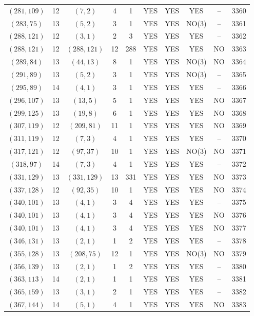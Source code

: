 \begin{longtable}{|c|c|c|c|c|c|c|c|c|c|}
$(281, 109)$ & 12 & $(7, 2)$ & 4 & 1 & YES & YES & YES & -- & 3360\\
$(283, 75)$ & 13 & $(5, 2)$ & 3 & 1 & YES & YES & NO(3) & -- & 3361\\
$(288, 121)$ & 12 & $(3, 1)$ & 2 & 3 & YES & YES & YES & -- & 3362\\
$(288, 121)$ & 12 & $(288, 121)$ & 12 & 288 & YES & YES & YES & NO & 3363\\
$(289, 84)$ & 13 & $(44, 13)$ & 8 & 1 & YES & YES & NO(3) & NO & 3364\\
$(291, 89)$ & 13 & $(5, 2)$ & 3 & 1 & YES & YES & NO(3) & -- & 3365\\
$(295, 89)$ & 14 & $(4, 1)$ & 3 & 1 & YES & YES & YES & -- & 3366\\
$(296, 107)$ & 13 & $(13, 5)$ & 5 & 1 & YES & YES & YES & NO & 3367\\
$(299, 125)$ & 13 & $(19, 8)$ & 6 & 1 & YES & YES & YES & NO & 3368\\
$(307, 119)$ & 12 & $(209, 81)$ & 11 & 1 & YES & YES & YES & NO & 3369\\
$(311, 119)$ & 12 & $(7, 3)$ & 4 & 1 & YES & YES & YES & -- & 3370\\
$(317, 121)$ & 12 & $(97, 37)$ & 10 & 1 & YES & YES & NO(3) & NO & 3371\\
$(318, 97)$ & 14 & $(7, 3)$ & 4 & 1 & YES & YES & YES & -- & 3372\\
$(331, 129)$ & 13 & $(331, 129)$ & 13 & 331 & YES & YES & YES & NO & 3373\\
$(337, 128)$ & 12 & $(92, 35)$ & 10 & 1 & YES & YES & YES & NO & 3374\\
$(340, 101)$ & 13 & $(4, 1)$ & 3 & 4 & YES & YES & YES & -- & 3375\\
$(340, 101)$ & 13 & $(4, 1)$ & 3 & 4 & YES & YES & YES & NO & 3376\\
$(340, 101)$ & 13 & $(4, 1)$ & 3 & 4 & YES & YES & YES & NO & 3377\\
$(346, 131)$ & 13 & $(2, 1)$ & 1 & 2 & YES & YES & YES & -- & 3378\\
$(355, 128)$ & 13 & $(208, 75)$ & 12 & 1 & YES & YES & NO(3) & NO & 3379\\
$(356, 139)$ & 13 & $(2, 1)$ & 1 & 2 & YES & YES & YES & -- & 3380\\
$(363, 113)$ & 14 & $(2, 1)$ & 1 & 1 & YES & YES & YES & -- & 3381\\
$(365, 159)$ & 13 & $(3, 1)$ & 2 & 1 & YES & YES & YES & -- & 3382\\
$(367, 144)$ & 14 & $(5, 1)$ & 4 & 1 & YES & YES & YES & NO & 3383\\

\end{longtable}
